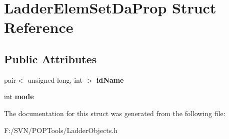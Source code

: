 \hypertarget{struct_ladder_elem_set_da_prop}{\section{Ladder\-Elem\-Set\-Da\-Prop Struct Reference}
\label{struct_ladder_elem_set_da_prop}
}
\subsection*{Public Attributes}
\begin{DoxyCompactItemize}
\item 
\hypertarget{struct_ladder_elem_set_da_prop_a64d4a03956a85ad1f0d598853ac38fda}{pair$<$ unsigned long, int $>$ {\bfseries id\-Name}}\label{struct_ladder_elem_set_da_prop_a64d4a03956a85ad1f0d598853ac38fda}

\item 
\hypertarget{struct_ladder_elem_set_da_prop_ab4bae96f58807332b82933a8240563b9}{int {\bfseries mode}}\label{struct_ladder_elem_set_da_prop_ab4bae96f58807332b82933a8240563b9}

\end{DoxyCompactItemize}


The documentation for this struct was generated from the following file\-:\begin{DoxyCompactItemize}
\item 
F\-:/\-S\-V\-N/\-P\-O\-P\-Tools/Ladder\-Objects.\-h\end{DoxyCompactItemize}
